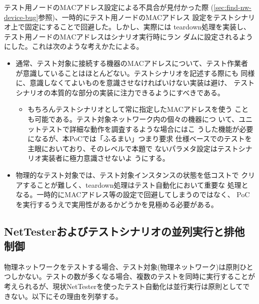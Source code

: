テスト用ノードのMACアドレス設定による不具合が見付かった際
(\ref{sec:find-nw-device-bug}参照)、一時的にテスト用ノードのMACアドレス
設定をテストシナリオ上で固定にすることで回避した。しかし、実際には
teardown処理を実装し、テスト用ノードのMACアドレスはシナリオ実行時にラン
ダムに設定されるようにした。これは次のような考えかたによる。
\begin{itemize}
 \item 通常、テスト対象に接続する機器のMACアドレスについて、テスト作業者
       が意識していることはほとんどない。テストシナリオを記述する際にも
       同様に、意識しなくてよいものを意識させなければいけない実装は避け、
       テストシナリオの本質的な部分の実装に注力できるようにすべきである。
       \begin{itemize}
        \item もちろんテストシナリオとして常に指定したMACアドレスを使う
              ことも可能である。テスト対象ネットワーク内の個々の機器につ
              いて、ユニットテストで詳細な動作を調査するような場合にはこ
              うした機能が必要になるが、本PoCでは「ふるまい」つまり要求
              仕様ベースでのテストを主眼においており、そのレベルで本題で
              ないパラメタ設定はテストシナリオ実装者に極力意識させないよ
              うにする。
       \end{itemize}
 \item 物理的なテスト対象では、テスト対象インスタンスの状態を低コストで
       クリアすることが難しく、teardown処理はテスト自動化において重要な
       処理となる。一時的にMACアドレス等の設定で回避してしまうのではなく、
       PoCを実行するうえで実用性があるかどうかを見極める必要がある。
\end{itemize}

\subsection{NetTesterおよびテストシナリオの並列実行と排他制御}

物理ネットワークをテストする場合、テスト対象(物理ネットワーク)は原則ひと
つしかない。テストの数が多くなる場合、複数のテストを同時に実行することが
考えられるが、現状NetTesterを使ったテスト自動化は並行実行は原則としてで
きない。以下にその理由を列挙する。

